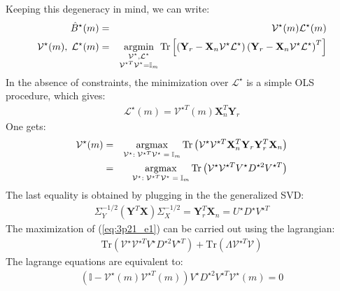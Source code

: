 Keeping this degeneracy in mind, we can write:
\begin{eqnarray*}
\hat{B} ^{\star}(m) & = & \mathcal{V} ^{\star}(m) \mathcal{L} ^{\star}(m)\\
\mathcal{V} ^{\star}(m), \; \mathcal{L} ^{\star}(m) & = & \operatorname*{argmin}_{\substack{\mathcal{V} ^{\star}, \mathcal{L}^{\star}\\ \mathcal{V}^{\star T} \mathcal{V} ^{\star} = \mathbb{I}_m}} \textrm{Tr} \left[  \left( \mathbf{Y}_r - \mathbf{X}_n \mathcal{V} ^{\star} \mathcal{L} ^{\star} \right) \left( \mathbf{Y}_r - \mathbf{X}_n  \mathcal{V} ^{\star} \mathcal{L} ^{\star} \right) ^T \right]
\end{eqnarray*}
In the absence of constraints, the minimization over $\mathcal{L} ^{\star}$ is a simple OLS procedure, which gives:
\begin{eqnarray*}
\mathcal{L} ^{\star}(m) = \mathcal{V} ^{\star T}(m) \mathbf{X}_n ^{T} \mathbf{Y}_r
\end{eqnarray*}
One gets:
\begin{eqnarray} \nonumber
\mathcal{V} ^{\star}(m) & = & \operatorname*{argmax}_{\mathcal{V} ^{\star}: \; \mathcal{V} ^{\star T} \mathcal{V} ^{\star}\; = \; \mathbb{I}_m} \textrm{Tr} \left( \mathcal{V}^{\star} \mathcal{V} ^{\star T} \mathbf{X}_n^T \mathbf{Y}_r \mathbf{Y}_r^T \mathbf{X}_n \right)\\ \label{eq:3p21_e1}
& = & \operatorname*{argmax}_{\mathcal{V} ^{\star}: \; \mathcal{V} ^{\star T} \mathcal{V} ^{\star}\; = \; \mathbb{I}_m} \textrm{Tr} \left( \mathcal{V}^{\star} \mathcal{V} ^{\star T} V ^{\star} D ^{\star 2} V ^{\star T} \right)
\end{eqnarray}
The last equality is obtained by plugging in the the generalized SVD:
\begin{eqnarray} \label{eq:3p21_e2}
\Sigma_Y^{-1/2} (\mathbf{Y}^T \mathbf{X}) \Sigma_X^{-1/2} = \mathbf{Y}_r^T \mathbf{X}_n = U ^{\star} D ^{\star} V ^{\star T}
\end{eqnarray}
The maximization of (\ref{eq:3p21_e1}) can be carried out using the lagrangian:
\begin{eqnarray*}
\textrm{Tr} \left( \mathcal{V}^{\star} \mathcal{V} ^{\star T} V ^{\star} D ^{\star 2} V ^{\star T} \right) + \textrm{Tr} \left( \Lambda \mathcal{V} ^{\star T} \mathcal{V} \right)
\end{eqnarray*}
The lagrange equations are equivalent to:
\begin{eqnarray*}
\left( \mathbb{I} - \mathcal{V} ^{\star}(m) \mathcal{V} ^{\star T}(m) \right) V ^{\star} D ^{\star 2} V ^{\star T} \mathcal{V} ^{\star}(m)  = 0
\end{eqnarray*}
